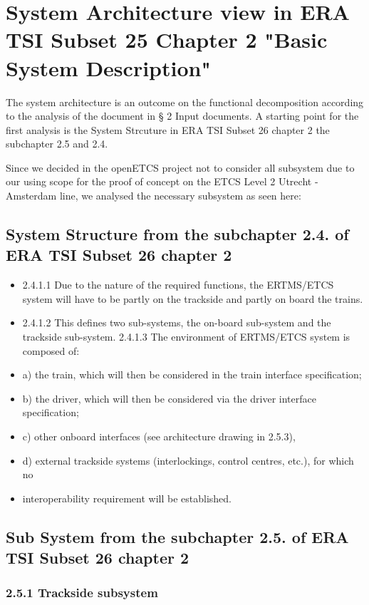 
\section{System Architecture view in ERA TSI Subset 25 Chapter 2 "Basic System Description"}
The system architecture is an outcome on the functional decomposition according to the analysis of the document in § 2 Input documents. A starting point for the first analysis is the System Strcuture in ERA TSI Subset 26 chapter 2 the subchapter 2.5 and 2.4.

Since we decided in the openETCS project not to consider all subsystem due to our using scope for the proof of concept on the ETCS Level 2 Utrecht - Amsterdam line, we analysed the necessary subsystem as seen here:

\subsection{System Structure from the subchapter 2.4. of ERA TSI Subset 26 chapter 2}

\begin{itemize}
\item 2.4.1.1	Due to the nature of the required functions, the ERTMS/ETCS system will have to be partly on the trackside and partly on board the trains. 
\item 2.4.1.2	This defines two sub-systems, the on-board sub-system and the trackside sub-system.
2.4.1.3	The environment of ERTMS/ETCS system is composed of:
\item a)	the train, which will then be considered in the train interface specification;
\item b)	the driver, which will then be considered via the driver interface specification;
\item c)	other onboard interfaces (see architecture drawing in 2.5.3),
\item d)	external trackside systems (interlockings, control centres, etc.), for which no 
\item interoperability requirement will be established.
\end{itemize}

\subsection{Sub System from the subchapter 2.5. of ERA TSI Subset 26 chapter 2}
\subsubsection{2.5.1 Trackside subsystem}
